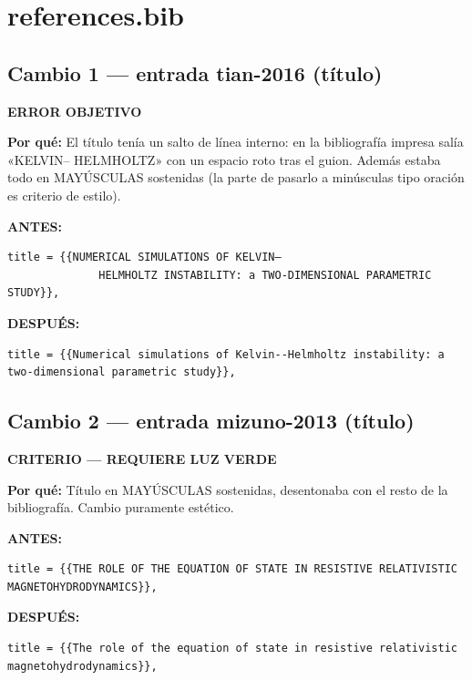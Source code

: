 \documentclass[11pt,a4paper]{article}
\begin{document}
\section*{references.bib}
\subsection*{Cambio 1 --- entrada tian-2016 (título)}
\colorbox{okbg}{\textbf{\footnotesize ERROR OBJETIVO}}

\textbf{Por qué:} El título tenía un salto de línea interno: en la bibliografía impresa salía «KELVIN-- HELMHOLTZ» con un espacio roto tras el guion. Además estaba todo en MAYÚSCULAS sostenidas (la parte de pasarlo a minúsculas tipo oración es criterio de estilo).

\textcolor{antesline}{\textbf{ANTES:}}
\begin{Verbatim}[breaklines=true, breakanywhere=true, fontsize=\small, frame=leftline, rulecolor=\color{antesline}, framerule=1.2pt]
	title = {{NUMERICAL SIMULATIONS OF KELVIN–
              HELMHOLTZ INSTABILITY: a TWO-DIMENSIONAL PARAMETRIC STUDY}},
\end{Verbatim}
\textcolor{despline}{\textbf{DESPUÉS:}}
\begin{Verbatim}[breaklines=true, breakanywhere=true, fontsize=\small, frame=leftline, rulecolor=\color{despline}, framerule=1.2pt]
	title = {{Numerical simulations of Kelvin--Helmholtz instability: a two-dimensional parametric study}},
\end{Verbatim}

\subsection*{Cambio 2 --- entrada mizuno-2013 (título)}
\colorbox{critbg}{\textbf{\footnotesize CRITERIO --- REQUIERE LUZ VERDE}}

\textbf{Por qué:} Título en MAYÚSCULAS sostenidas, desentonaba con el resto de la bibliografía. Cambio puramente estético.

\textcolor{antesline}{\textbf{ANTES:}}
\begin{Verbatim}[breaklines=true, breakanywhere=true, fontsize=\small, frame=leftline, rulecolor=\color{antesline}, framerule=1.2pt]
	title = {{THE ROLE OF THE EQUATION OF STATE IN RESISTIVE RELATIVISTIC MAGNETOHYDRODYNAMICS}},
\end{Verbatim}
\textcolor{despline}{\textbf{DESPUÉS:}}
\begin{Verbatim}[breaklines=true, breakanywhere=true, fontsize=\small, frame=leftline, rulecolor=\color{despline}, framerule=1.2pt]
	title = {{The role of the equation of state in resistive relativistic magnetohydrodynamics}},
\end{Verbatim}
\end{document}
